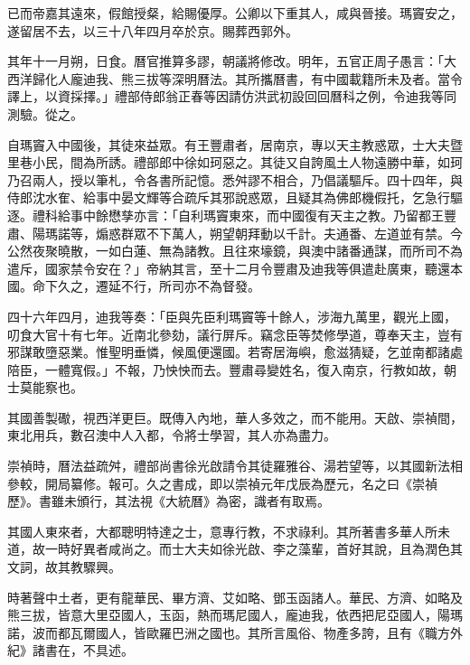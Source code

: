 \begin{pinyinscope}
已而帝嘉其遠來，假館授粲，給賜優厚。公卿以下重其人，咸與晉接。瑪竇安之，遂留居不去，以三十八年四月卒於京。賜葬西郭外。

其年十一月朔，日食。曆官推算多謬，朝議將修改。明年，五官正周子愚言：「大西洋歸化人龐迪我、熊三拔等深明曆法。其所攜曆書，有中國載籍所未及者。當令譯上，以資採擇。」禮部侍郎翁正春等因請仿洪武初設回回曆科之例，令迪我等同測驗。從之。

自瑪竇入中國後，其徒來益眾。有王豐肅者，居南京，專以天主教惑眾，士大夫暨里巷小民，間為所誘。禮部郎中徐如珂惡之。其徒又自誇風土人物遠勝中華，如珂乃召兩人，授以筆札，令各書所記憶。悉舛謬不相合，乃倡議驅斥。四十四年，與侍郎沈水隺、給事中晏文輝等合疏斥其邪說惑眾，且疑其為佛郎機假托，乞急行驅逐。禮科給事中餘懋孳亦言：「自利瑪竇東來，而中國復有天主之教。乃留都王豐肅、陽瑪諾等，煽惑群眾不下萬人，朔望朝拜動以千計。夫通番、左道並有禁。今公然夜聚曉散，一如白蓮、無為諸教。且往來壕鏡，與澳中諸番通謀，而所司不為遣斥，國家禁令安在？」帝納其言，至十二月令豐肅及迪我等俱遣赴廣東，聽還本國。命下久之，遷延不行，所司亦不為督發。

四十六年四月，迪我等奏：「臣與先臣利瑪竇等十餘人，涉海九萬里，觀光上國，叨食大官十有七年。近南北參劾，議行屏斥。竊念臣等焚修學道，尊奉天主，豈有邪謀敢墮惡業。惟聖明垂憐，候風便還國。若寄居海嶼，愈滋猜疑，乞並南都諸處陪臣，一體寬假。」不報，乃怏怏而去。豐肅尋變姓名，復入南京，行教如故，朝士莫能察也。

其國善製礮，視西洋更巨。既傳入內地，華人多效之，而不能用。天啟、崇禎間，東北用兵，數召澳中人入都，令將士學習，其人亦為盡力。

崇禎時，曆法益疏舛，禮部尚書徐光啟請令其徒羅雅谷、湯若望等，以其國新法相參較，開局纂修。報可。久之書成，即以崇禎元年戊辰為歷元，名之曰《崇禎歷》。書雖未頒行，其法視《大統曆》為密，識者有取焉。

其國人東來者，大都聰明特達之士，意專行教，不求祿利。其所著書多華人所未道，故一時好異者咸尚之。而士大夫如徐光啟、李之藻輩，首好其說，且為潤色其文詞，故其教驟興。

時著聲中土者，更有龍華民、畢方濟、艾如略、鄧玉函諸人。華民、方濟、如略及熊三拔，皆意大里亞國人，玉函，熱而瑪尼國人，龐迪我，依西把尼亞國人，陽瑪諾，波而都瓦爾國人，皆歐羅巴洲之國也。其所言風俗、物產多誇，且有《職方外紀》諸書在，不具述。


\end{pinyinscope}